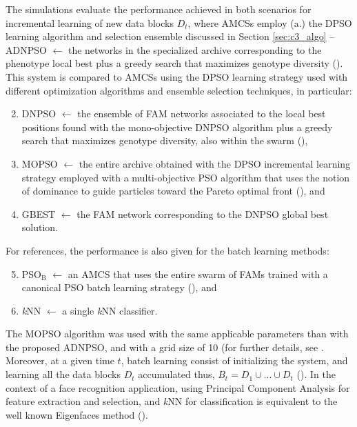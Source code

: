 The simulations evaluate the performance achieved in both scenarios for incremental learning of new data blocks $D_t$, where AMCSs employ (a.) the DPSO learning algorithm and selection ensemble discussed in Section \ref{sec:c3_algo} -- ADNPSO $\leftarrow$ the networks in the specialized archive corresponding to the phenotype local best plus a greedy search that maximizes genotype diversity (\cite{connolly11}).
This system is compared to AMCSs using the DPSO learning strategy used with different optimization algorithms and ensemble selection techniques, in particular:
 \begin{enumerate}
	\setcounter{enumi}{1}
	\item DNPSO $\leftarrow$ the ensemble of FAM networks associated to the local best positions found with the mono-objective DNPSO algorithm plus a greedy search that maximizes genotype diversity, also within the swarm (\cite{connolly11}),
 	\item MOPSO $\leftarrow$ the entire archive obtained with the DPSO incremental learning strategy employed with a multi-objective PSO algorithm that uses the notion of dominance to guide particles toward the Pareto optimal front (\cite{coello04}), and
	\item GBEST $\leftarrow$ the FAM network corresponding to the DNPSO global best solution.
\end{enumerate}
For references, the performance is also given for the batch learning methods:
 \begin{enumerate}
	\setcounter{enumi}{4}
 	\item PSO$_\text{B}$ $\leftarrow$ an AMCS that uses the entire swarm of FAMs trained with a canonical PSO batch learning strategy (\cite{granger07}), and 
 	\item \textit{k}NN $\leftarrow$ a single \textit{k}NN classifier.
\end{enumerate}
The MOPSO algorithm was used with the same applicable parameters than with the proposed ADNPSO, and with a grid size of 10 (for further details, see \cite{coello04}.
Moreover, at a given time $t$, batch learning consist of initializing the system, and learning all the data blocks $D_t$ accumulated thus, $B_t = D_1\cup...\cup D_t$ (\cite{granger07}).
In the context of a face recognition application, using Principal Component Analysis for feature extraction and selection, and \textit{k}NN for classification is equivalent to the well known Eigenfaces method (\cite{turk91}).

